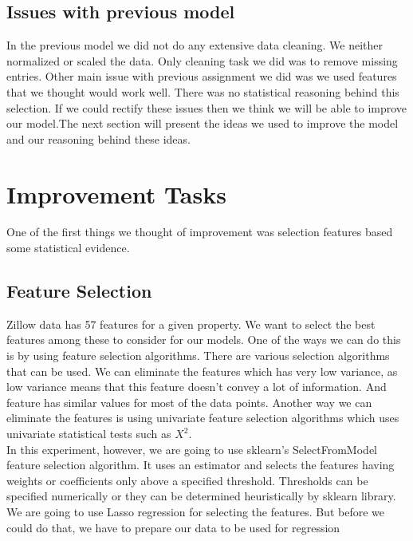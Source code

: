 \documentclass[a4paper, 11pt]{article}
\begin{document}
\subsection{Issues with previous model}
In the previous model we did not do any extensive data cleaning. We neither normalized or scaled the data. Only cleaning task we did was to remove missing entries. Other main issue with previous assignment we did was we used features that we thought would work well. There was no statistical reasoning behind this selection. If we could rectify these issues then we think we will be able to improve our model.The next section will present the ideas we used to improve the model and our reasoning behind these ideas.
\section{Improvement Tasks}
One of the first things we thought of improvement was selection features based some statistical evidence.
\subsection{Feature Selection}
Zillow data has 57 features for a given property. We want to select the best features among these to consider for our models. One of the ways we can do this is by using feature selection algorithms. There are various selection algorithms that can be used. We can eliminate the features which has very low variance, as low variance means that this feature doesn't convey a lot of information. And feature has similar values for most of the data points. Another way we can eliminate the features is using univariate feature selection algorithms which uses univariate statistical tests such as $X^2$.\\
In this experiment, however, we are going to use sklearn's SelectFromModel feature selection algorithm. It uses an estimator and selects the features having weights or coefficients only above a specified threshold. Thresholds can be specified numerically or they can be determined heuristically by sklearn library. We are going to use Lasso regression for selecting the features. But before we could do that, we have to prepare our data to be used for regression
\end{document}
